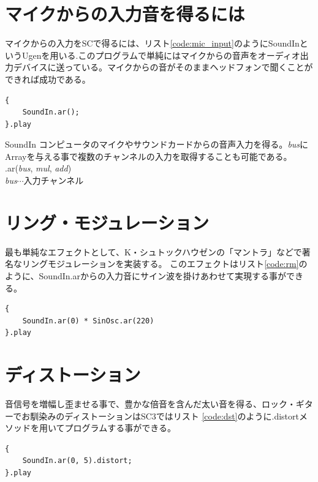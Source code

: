 \documentclass{jsarticle}
\begin{document}
\section{マイクからの入力音を得るには}
マイクからの入力をSCで得るには、リスト\ref{code:mic_input}のようにSoundInというUgenを用いる.このプログラムで単純にはマイクからの音声をオーディオ出力デバイスに送っている。マイクからの音がそのままヘッドフォンで聞くことができれば成功である。

\begin{lstlisting}[caption=マイク入力,label=code:mic_input]
{
	SoundIn.ar();
}.play
\end{lstlisting}

\begin{itembox}[l]{SoundIn}
{\footnotesize 
コンピュータのマイクやサウンドカードからの音声入力を得る。{\it bus}にArrayを与える事で複数のチャンネルの入力を取得することも可能である。\\
.ar({\it bus}, {\it mul}, {\it add})\\
{\it bus}$\cdots$入力チャンネル\\
}
\end{itembox}

\section{リング・モジュレーション}

最も単純なエフェクトとして、K・シュトックハウゼンの「マントラ」などで著名なリングモジュレーションを実装する。
このエフェクトはリスト\ref{code:rm}のように、SoundIn.arからの入力音にサイン波を掛けあわせて実現する事ができる。

\begin{lstlisting}[caption=リング・モジュレーション,label=code:rm]
{
	SoundIn.ar(0) * SinOsc.ar(220) 
}.play
\end{lstlisting}

\section{ディストーション}
音信号を増幅し歪ませる事で、豊かな倍音を含んだ太い音を得る、ロック・ギターでお馴染みのディストーションはSC3ではリスト
\ref{code:dst}のように.distortメソッドを用いてプログラムする事ができる。

\begin{lstlisting}[caption=ディストーション, label=code:dst]
{
	SoundIn.ar(0, 5).distort;
}.play
\end{lstlisting}
\end{document}
